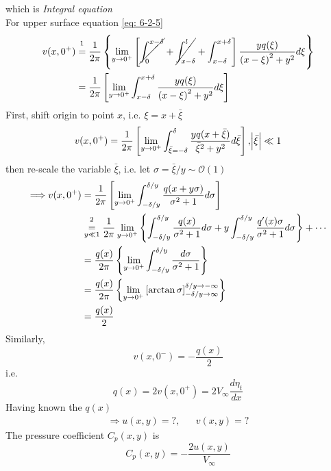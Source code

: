 \begin{itemize}
which is \emph{Integral equation}\\
For upper surface equation \eqref{eq: 6-2-5}
\begin{align*}
v(x,0^+)
&\vc{=}{\footnotemark}{}\frac{1}{2\pi}\left\{\lim_{y\to 0^+}\left[\cancel{\int_0^{x-\delta}} + \cancel{\int_{x-\delta}^l} + \int_{x-\delta}^{x+\delta}\right]\frac{yq(\xi)}{\left(x-\xi\right)^2+y^2}d\xi\right\} \\
&=\frac{1}{2\pi}\left[\lim_{y\to 0^+}\int_{x-\delta}^{x+\delta}\frac{yq(\xi)}{\left(x-\xi\right)^2+y^2}d\xi\right]
\end{align*}
First, shift origin to point $x$, i.e. $\xi=x+\bar{\xi}$
\begin{align}
v(x,0^+) = \frac{1}{2\pi}\left[\lim_{y\to 0^+}\int_{\bar{\xi}= -\delta}^{\delta}\frac{yq(x+\bar{\xi})}{\bar{\xi}^2+y^2}d\bar{\xi}\right], \abs{\bar{\xi}}\ll 1
\label{eq: 6-2-6}
\end{align}
then re-scale the variable $\bar{\xi}$, i.e. let $\sigma = \bar{\xi}/y\sim\mathcal{O}(1)$
\begin{align*}
\Longrightarrow v(x,0^+) 
&= \frac{1}{2\pi}\left[\lim_{y\to 0^+}\int_{-\delta/y}^{\delta/y}\frac{q(x+y\sigma)}{\sigma^2+1}d\sigma\right] \\
&\vc{=}{\footnotemark}{y\ll 1} \frac{1}{2\pi}\lim_{y\to 0^+}\left\{\int_{-\delta/y}^{\delta/y}\frac{q(x)}{\sigma^2+1}d\sigma + y\int_{-\delta/y}^{\delta/y}\frac{q'(x)\sigma}{\sigma^2+1}d\sigma\right\} + \cdots \\
&= \frac{q(x)}{2\pi}\left\{\lim_{y\to 0^+}\int_{-\delta/y}^{\delta/y}\frac{d\sigma}{\sigma^2+1}\right\} \\
&= \frac{q(x)}{2\pi}\left\{\lim_{y\to 0^+}\left[\arctan\sigma\right]_{-\delta/y\to\infty}^{\delta/y\to -\infty}\right\} \\
&= \frac{q(x)}{2}
\end{align*}
Similarly, 
\[
v(x,0^-) = -\frac{q(x)}{2}
\]
i.e.
\begin{equation}
q(x) = 2v(x,0^+) = 2V_\infty\frac{d\eta_t}{dx}
\label{eq: 6-2-7}
\end{equation}
Having known the $q(x)$
\begin{align*}
\Longrightarrow u(x,y)=?, && v(x,y) = ?
\end{align*}
The pressure coefficient $C_p(x,y)$ is 
\begin{equation}
C_p(x,y) = -\frac{2u(x,y)}{V_\infty}
\label{eq: 6-2-8}
\end{equation}

\end{itemize}
